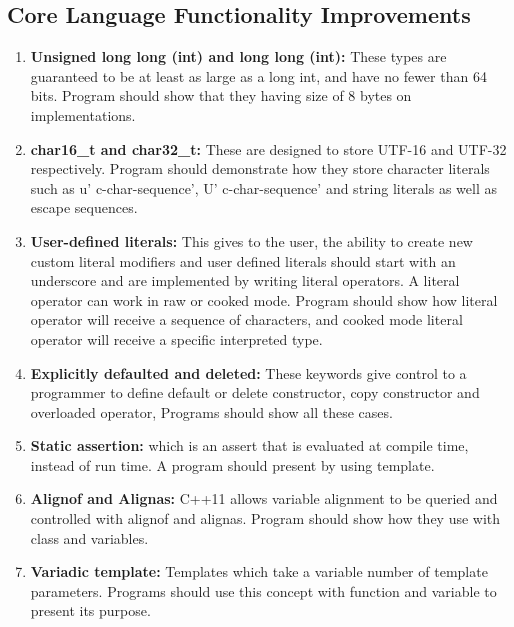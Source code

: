 \documentclass[11pt,]{report}
\begin{document}
\subsection{Core Language Functionality Improvements}
\begin{enumerate}
\item \textbf{Unsigned long long (int) and long long (int):} These types are \linebreak guaranteed to be at least as large as a long int, and have no fewer than 64 bits. Program should show that they having size of 8 bytes on \linebreak implementations.

\item \textbf{char16\_t and char32\_t:} These are designed to store UTF-16 and \linebreak UTF-32 respectively. Program should demonstrate how they \linebreak store character literals such as u' c-char-sequence', U' c-char-sequence' and string literals as well as escape sequences.

\item \textbf{User-defined literals:} This gives to the user, the ability to create new custom literal modifiers and  user defined literals should start with an underscore and are implemented by writing literal operators. A literal operator can work in raw or cooked mode. Program should show how literal operator will receive a sequence of characters, and cooked mode literal operator will receive a specific interpreted type.

\item \textbf{Explicitly defaulted and deleted:} These keywords give control to a programmer to define default or delete constructor, copy constructor and overloaded operator, Programs should show all these cases.

\item \textbf{Static assertion:} which is an assert that is evaluated at compile time, instead of run time. A program should present by using template.

\item \textbf{Alignof and Alignas:} C++11 allows variable alignment to be queried and controlled with alignof and alignas. Program should show how they use with class and variables.

\item \textbf{Variadic template:} Templates which take a variable number of template parameters. Programs should use this concept with function and variable to present its purpose.
\end{enumerate}
\end{document}
